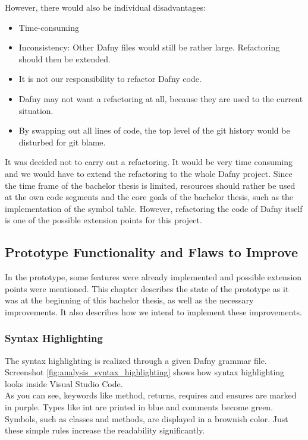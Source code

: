 However, there would also be individual disadvantages:
\begin{itemize}
    \item Time-consuming
    \item Inconsistency: Other Dafny files would still be rather large. Refactoring should then be extended.
    \item It is not our responsibility to refactor Dafny code.
    \item Dafny may not want a refactoring at all, because they are used to the current situation.
    \item By swapping out all lines of code, the top level of the git history would be disturbed for git blame.
\end{itemize}

It was decided not to carry out a refactoring.
It would be very time consuming and we would have to extend the refactoring to the whole Dafny project.
Since the time frame of the bachelor thesis is limited, resources should rather be used at the own code segments and the core goals of the bachelor thesis, such as the implementation of the symbol table.
However, refactoring the code of Dafny itself is one of the possible extension points for this project.



\subsection{Prototype Functionality and Flaws to Improve}
\label{section:analysis:features}
In the prototype, some features were already implemented and possible extension points were mentioned.
This chapter describes the state of the prototype as it was at the beginning of this bachelor thesis, as well as the necessary improvements.
It also describes how we intend to implement these improvements.

\subsubsection{Syntax Highlighting}
The syntax highlighting is realized through a given Dafny grammar file.
Screenshot \ref{fig:analysis_syntax_highlighting} shows how syntax highlighting looks inside Visual Studio Code. \\

As you can see, keywords like method, returns, requires and ensures are marked in purple.
Types like int are printed in blue and comments become green.
Symbols, such as classes and methods, are displayed in a brownish color.
Just these simple rules increase the readability significantly.

